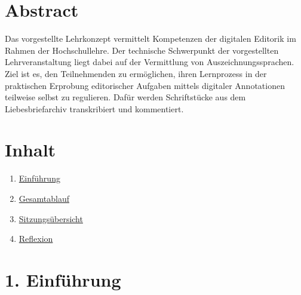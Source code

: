 \documentclass[
          a4paper,
        ]{article}
\begin{document}
\pagestyle{plain}


\maketitle
















\pagestyle{page}

\renewcommand{\arraystretch}{3}  %

\section{Abstract}\label{abstract}

Das vorgestellte Lehrkonzept vermittelt Kompetenzen der digitalen
Editorik im Rahmen der Hochschullehre. Der technische Schwerpunkt der
vorgestellten Lehrveranstaltung liegt dabei auf der Vermittlung von
Auszeichnungssprachen. Ziel ist es, den Teilnehmenden zu ermöglichen,
ihren Lernprozess in der praktischen Erprobung editorischer Aufgaben
mittels digitaler Annotationen teilweise selbst zu regulieren. Dafür
werden Schriftstücke aus dem Liebesbriefarchiv transkribiert und
kommentiert.

\section{Inhalt}\label{inhalt}

\begin{enumerate}
\def\labelenumi{\arabic{enumi}.}
\item
  \hyperref[einfuxfchrung]{Einführung}
\item
  \hyperref[gesamtablauf]{Gesamtablauf}
\item
  \hyperref[sitzungsuxfcbersicht]{Sitzungsübersicht}
\item
  \hyperref[reflexion]{Reflexion}
\end{enumerate}

\section{1. Einführung}\label{einfuxfchrung}
\end{document}

